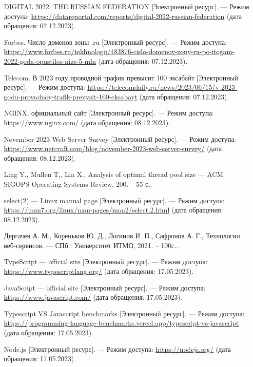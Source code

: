 \begin{thebibliography}{}
	DIGITAL 2022: THE RUSSIAN FEDERATION [Электронный ресурс]. --- Режим доступа: \url{https://datareportal.com/reports/digital-2022-russian-federation} (дата обращения: 07.12.2023).
	
	Forbes. Число доменов зоны .ru [Электронный ресурс]. --- Режим доступа: \url{https://www.forbes.ru/tekhnologii/483876-cislo-domenov-zony-ru-po-itogam-2022-goda-opustilos-nize-5-mln} (дата обращения: 07.12.2023).
	

	Telecom. В 2023 году проводной трафик превысит 100 эксабайт [Электронный ресурс]. --- Режим доступа: \url{https://telecomdaily.ru/news/2023/06/15/v-2023-godu-provodnoy-trafik-prevysit-100-eksabayt} (дата обращения: 07.12.2023).

	NGINX, официальный сайт [Электронный ресурс]. --- Режим доступа: \url{https://www.nginx.com/} (дата обращения: 08.12.2023).

	November 2023 Web Server Survey [Электронный ресурс]. --- Режим доступа: \url{https://www.netcraft.com/blog/november-2023-web-server-survey/} (дата обращения: 08.12.2023).
	
	Ling Y., Mullen T,, Lin X., Analysis of optimal thread pool size --- ACM SIGOPS Operating Systems Review, 200. -- 55 с..
	
	select(2) — Linux manual page [Электронный ресурс]. --- Режим доступа: \url{https://man7.org/linux/man-pages/man2/select.2.html} (дата обращения: 08.12.2023).
	
	Дергачев А. М., Кореньков Ю. Д., Логинов И. П., Сафронов А. Г., Технологии веб-сервисов. --- СПб.: Университет ИТМО, 2021. -- 100с..
	
	TypeScript --- official site [Электронный ресурс]. --- Режим доступа: \url{https://www.typescriptlang.org/} (дата обращения: 17.05.2023).

	JavaScript --- official site [Электронный ресурс]. --- Режим доступа: \url{https://www.javascript.com/} (дата обращения: 17.05.2023).
	
	Typescript VS Javascript benchmarks [Электронный ресурс]. --- Режим доступа: \url{https://programming-language-benchmarks.vercel.app/typescript-vs-javascript} (дата обращения: 17.05.2023).

	 Node.js [Электронный ресурс]. --- Режим доступа: \url{https://nodejs.org/} (дата обращения: 17.05.2023).
	

\end{thebibliography}
